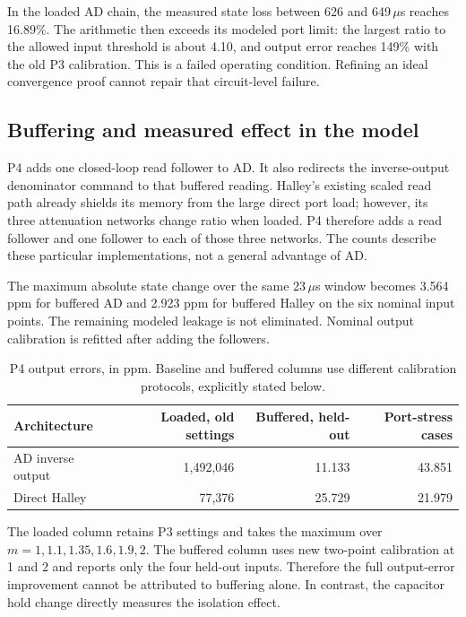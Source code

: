 \documentclass[11pt,a4paper]{article}
\theoremstyle{remark}\newtheorem{remark}[theorem]{Remark}
\numberwithin{equation}{section}
\begin{document}
In the loaded AD chain, the measured state loss between 626 and 649\,$\mu$s reaches 16.89\%. The arithmetic then exceeds its modeled port limit: the largest ratio to the allowed input threshold is about 4.10, and output error reaches 149\% with the old P3 calibration. This is a failed operating condition. Refining an ideal convergence proof cannot repair that circuit-level failure.

\subsection{Buffering and measured effect in the model}
P4 adds one closed-loop read follower to AD. It also redirects the inverse-output denominator command to that buffered reading. Halley's existing scaled read path already shields its memory from the large direct port load; however, its three attenuation networks change ratio when loaded. P4 therefore adds a read follower and one follower to each of those three networks. The counts describe these particular implementations, not a general advantage of AD.

The maximum absolute state change over the same 23\,$\mu$s window becomes 3.564 ppm for buffered AD and 2.923 ppm for buffered Halley on the six nominal input points. The remaining modeled leakage is not eliminated. Nominal output calibration is refitted after adding the followers.

\begin{table}[htbp]\centering\small
\caption{P4 output errors, in ppm. Baseline and buffered columns use different calibration protocols, explicitly stated below.}\label{tab:analog}
\begin{tabular}{@{}lrrr@{}}\toprule
Architecture & Loaded, old settings & Buffered, held-out & Port-stress cases\\\midrule
AD inverse output & 1,492,046 & 11.133 & 43.851\\
Direct Halley & 77,376 & 25.729 & 21.979\\\bottomrule
\end{tabular}
\end{table}

The loaded column retains P3 settings and takes the maximum over $m=1,1.1,1.35,1.6,1.9,2$. The buffered column uses new two-point calibration at 1 and 2 and reports only the four held-out inputs. Therefore the full output-error improvement cannot be attributed to buffering alone. In contrast, the capacitor hold change directly measures the isolation effect.
\end{document}
